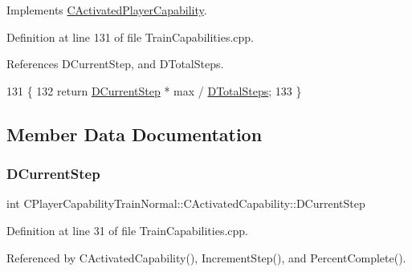 Implements \hyperlink{classCActivatedPlayerCapability_a405dc6076058006a4f801727de4cfe4d}{C\+Activated\+Player\+Capability}.



Definition at line 131 of file Train\+Capabilities.\+cpp.



References D\+Current\+Step, and D\+Total\+Steps.


\begin{DoxyCode}
131                                                                             \{
132     \textcolor{keywordflow}{return} \hyperlink{classCPlayerCapabilityTrainNormal_1_1CActivatedCapability_a2053317e0ee29f45f4ff5a28269cd635}{DCurrentStep} * max / \hyperlink{classCPlayerCapabilityTrainNormal_1_1CActivatedCapability_a2bee6a6395fd7cc0fcf4001bbbadb165}{DTotalSteps};
133 \}
\end{DoxyCode}


\subsection{Member Data Documentation}
\hypertarget{classCPlayerCapabilityTrainNormal_1_1CActivatedCapability_a2053317e0ee29f45f4ff5a28269cd635}{}\label{classCPlayerCapabilityTrainNormal_1_1CActivatedCapability_a2053317e0ee29f45f4ff5a28269cd635} 
\subsubsection{\texorpdfstring{D\+Current\+Step}{DCurrentStep}}
{\footnotesize\ttfamily int C\+Player\+Capability\+Train\+Normal\+::\+C\+Activated\+Capability\+::\+D\+Current\+Step\hspace{0.3cm}{\ttfamily [protected]}}



Definition at line 31 of file Train\+Capabilities.\+cpp.



Referenced by C\+Activated\+Capability(), Increment\+Step(), and Percent\+Complete().

\hypertarget{classCPlayerCapabilityTrainNormal_1_1CActivatedCapability_a1b994a572ca0fdfd64f6f71afb6b5988}{}\label{classCPlayerCapabilityTrainNormal_1_1CActivatedCapability_a1b994a572ca0fdfd64f6f71afb6b5988} 
